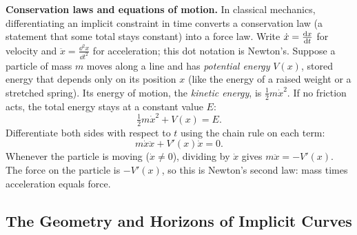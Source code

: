 \begin{applicationbox}
\textbf{Conservation laws and equations of motion.}
In classical mechanics, differentiating an implicit constraint in time converts a conservation law (a
statement that some total stays constant) into a force law. Write $\dot{x} = \frac{\mathrm{d} x}{\mathrm{d} t}$ for velocity and $\ddot{x} = \tfrac{\dd^2 x}{\dd t^2}$ for acceleration; this dot notation is Newton's. Suppose a particle of mass $m$ moves along a line and has \emph{potential energy} $V(x)$, stored energy that depends only on its position $x$ (like the energy of a raised weight or a stretched spring). Its energy of motion, the \emph{kinetic energy}, is $\tfrac12 m\dot{x}^2$. If no friction acts, the total energy stays at a constant value $E$:
\[
  \tfrac12 m\dot{x}^2 + V(x) = E.
\]
Differentiate both sides with respect to $t$ using the chain rule on each term:
\[
  m\dot{x}\ddot{x} + V'(x)\dot{x} = 0.
\]
Whenever the particle is moving ($\dot{x}\ne 0$), dividing by $\dot{x}$ gives $m\ddot{x} = -V'(x)$. The force on the particle is $-V'(x)$, so this is Newton's second law: mass times acceleration equals force.
\end{applicationbox}

\subsection{The Geometry and Horizons of Implicit Curves}
\label{ch13:what-unlocked}

